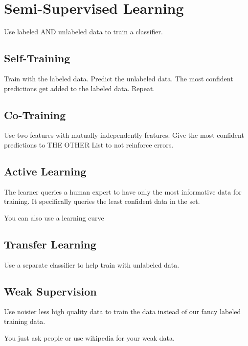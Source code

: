 \documentclass[fleqn]{report}
\begin{document}
\section{Semi-Supervised Learning}
Use labeled AND unlabeled data to train a classifier.

\subsection{Self-Training}
Train with the labeled data. Predict the unlabeled data. The most confident 
predictions get added to the labeled data. Repeat.

\subsection{Co-Training}
Use two features with mutually independently features. Give the 
most confident predictions to THE OTHER List to not reinforce errors.

\subsection{Active Learning}
The learner queries a human expert to have only the most informative data 
for training. It specifically queries the least confident data in the set.

You can also use a learning curve 

\subsection{Transfer Learning}
Use a separate classifier to help train with unlabeled data.

\subsection{Weak Supervision}
Use noisier less high quality data to train the data instead of our fancy 
labeled training data.

You just ask people or use wikipedia for your weak data.
\end{document}
